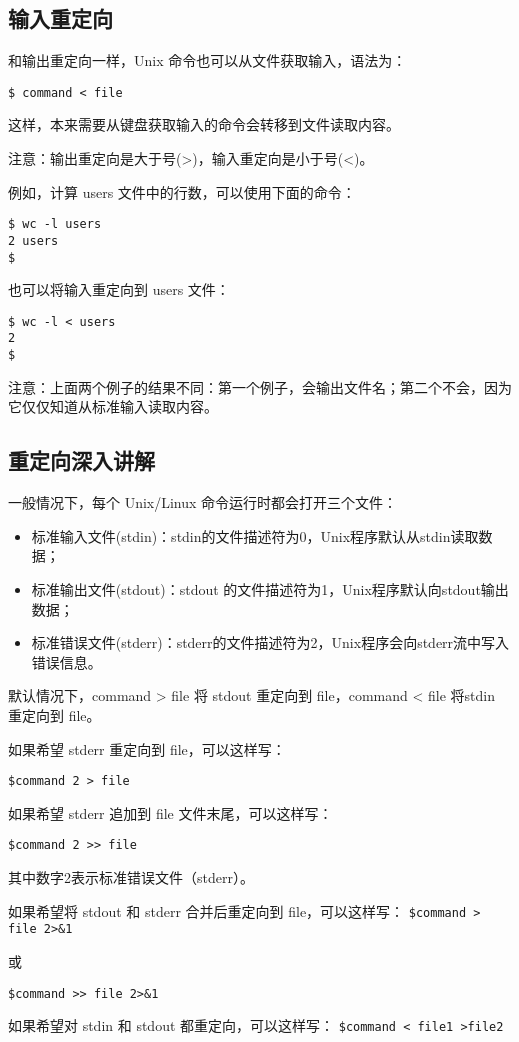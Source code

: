 \subsection{输入重定向}
和输出重定向一样，Unix 命令也可以从文件获取输入，语法为：

\verb|$ command < file|

这样，本来需要从键盘获取输入的命令会转移到文件读取内容。

注意：输出重定向是大于号(>)，输入重定向是小于号(<)。

例如，计算 users 文件中的行数，可以使用下面的命令：
\begin{verbatim}
$ wc -l users
2 users
$
\end{verbatim}

也可以将输入重定向到 users 文件：
\begin{verbatim}
$ wc -l < users
2
$
\end{verbatim}
注意：上面两个例子的结果不同：第一个例子，会输出文件名；第二个不会，因为它仅仅知道从标准输入读取内容。


\subsection{重定向深入讲解}
一般情况下，每个 Unix/Linux 命令运行时都会打开三个文件：
\begin{itemize}
\item
 标准输入文件(stdin)：stdin的文件描述符为0，Unix程序默认从stdin读取数据；
 \item
标准输出文件(stdout)：stdout 的文件描述符为1，Unix程序默认向stdout输出数据；
\item
标准错误文件(stderr)：stderr的文件描述符为2，Unix程序会向stderr流中写入错误信息。
\end{itemize}
默认情况下，command > file 将 stdout 重定向到 file，command < file 将stdin 重定向到 file。

如果希望 stderr 重定向到 file，可以这样写：

\verb|$command 2 > file|

如果希望 stderr 追加到 file 文件末尾，可以这样写：

\verb|$command 2 >> file|

其中数字2表示标准错误文件（stderr）。

如果希望将 stdout 和 stderr 合并后重定向到 file，可以这样写：
\verb|$command > file 2>&1|

或

\verb|$command >> file 2>&1|

如果希望对 stdin 和 stdout 都重定向，可以这样写：
\verb|$command < file1 >file2|

